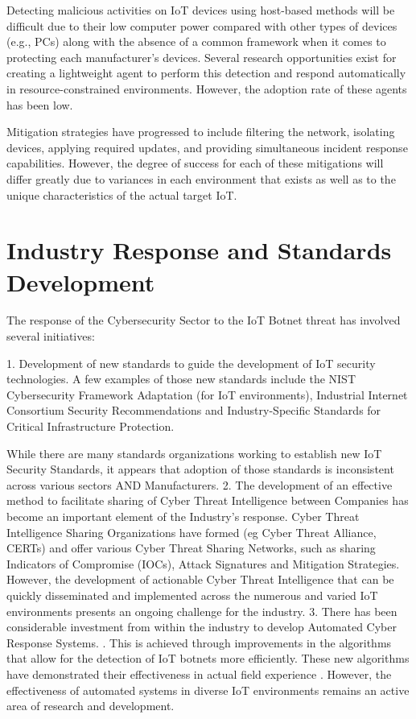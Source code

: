 \documentclass[12pt,letterpaper]{report}
\begin{document}
Detecting malicious activities on IoT devices using host-based methods will be difficult due to their low computer power compared with other types of devices (e.g., PCs) along with the absence of a common framework when it comes to protecting each manufacturer’s devices. Several research opportunities exist for creating a lightweight agent to perform this detection and respond automatically in resource-constrained environments. However, the adoption rate of these agents has been low.

Mitigation strategies have progressed to include filtering the network, isolating devices, applying required updates, and providing simultaneous incident response capabilities. However, the degree of success for each of these mitigations will differ greatly due to variances in each environment that exists as well as to the unique characteristics of the actual target IoT.

\section{Industry Response and Standards Development}

The response of the Cybersecurity Sector to the IoT Botnet threat has involved several initiatives:

1. Development of new standards to guide the development of IoT security technologies. A few examples of those new standards include the NIST Cybersecurity Framework Adaptation (for IoT environments), Industrial Internet Consortium Security Recommendations and Industry-Specific Standards for Critical Infrastructure Protection.

While there are many standards organizations working to establish new IoT Security Standards, it appears that adoption of those standards is inconsistent across various sectors AND Manufacturers.
2. The development of an effective method to facilitate sharing of Cyber Threat Intelligence between Companies has become an important element of the Industry's response. Cyber Threat Intelligence Sharing Organizations have formed (eg Cyber Threat Alliance, CERTs) and offer various Cyber Threat Sharing Networks, such as sharing Indicators of Compromise (IOCs), Attack Signatures and Mitigation Strategies. However, the development of actionable Cyber Threat Intelligence that can be quickly disseminated and implemented across the numerous and varied IoT environments presents an ongoing challenge for the industry.
3. There has been considerable investment from within the industry to develop Automated Cyber Response Systems. \cite{spring2024defensive}. This is achieved through improvements in the algorithms that allow for the detection of IoT botnets more efficiently. These new algorithms have demonstrated their effectiveness in actual field experience \cite{alghazzawi2024efficient}. However, the effectiveness of automated systems in diverse IoT environments remains an active area of research and development.
\end{document}
